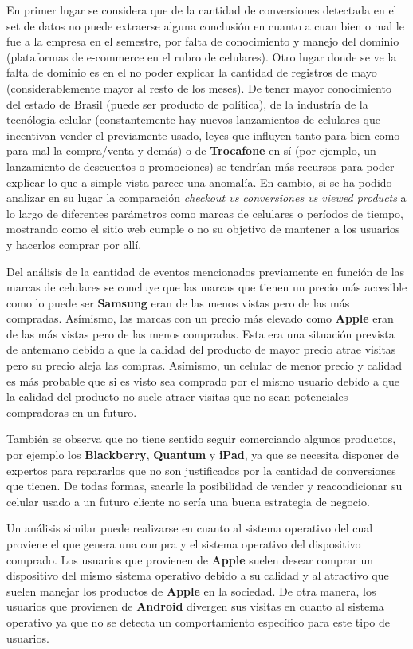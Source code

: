 \documentclass[a4paper]{article}
\begin{document}
En primer lugar se considera que de la cantidad de conversiones detectada en el set de datos no puede extraerse alguna conclusión en cuanto a cuan bien o mal le fue a la empresa en el semestre, por falta de conocimiento y manejo del dominio (plataformas de e-commerce en el rubro de celulares). Otro lugar donde se ve la falta de dominio es en el no poder explicar la cantidad de registros de mayo (considerablemente mayor al resto de los meses). De tener mayor conocimiento del estado de Brasil (puede ser producto de política), de la industría de la tecnólogia celular (constantemente hay nuevos lanzamientos de celulares que incentivan vender el previamente usado, leyes que influyen tanto para bien como para mal la compra/venta y demás) o de \textbf{Trocafone} en sí (por ejemplo, un lanzamiento de descuentos o promociones) se tendrían más recursos para poder explicar lo que a simple vista parece una anomalía. En cambio, si se ha podido analizar en su lugar la comparación \textit{checkout vs conversiones vs viewed products} a lo largo de diferentes parámetros como marcas de celulares o períodos de tiempo, mostrando como el sitio web cumple o no su objetivo de mantener a los usuarios y hacerlos comprar por allí.

Del análisis de la cantidad de eventos mencionados previamente en función de las marcas de celulares se concluye que las marcas que tienen un precio más accesible como lo puede ser \textbf{Samsung} eran de las menos vistas pero de las más compradas. Asímismo, las marcas con un precio más elevado como \textbf{Apple} eran de las más vistas pero de las menos compradas. Esta era una situación prevista de antemano debido a que la calidad del producto de mayor precio atrae visitas pero su precio aleja las compras. Asímismo, un celular de menor precio y calidad es más probable que si es visto sea comprado por el mismo usuario debido a que la calidad del producto no suele atraer visitas que no sean potenciales compradoras en un futuro. 

También se observa que no tiene sentido seguir comerciando algunos productos, por ejemplo los \textbf{Blackberry}, \textbf{Quantum} y  \textbf{iPad}, ya que se necesita disponer de expertos para repararlos que no son justificados por la cantidad de conversiones que tienen. De todas formas, sacarle la posibilidad de vender y reacondicionar su celular usado a un futuro cliente no sería una buena estrategia de negocio.

Un análisis similar puede realizarse en cuanto al sistema operativo del cual proviene el que genera una compra y el sistema operativo del dispositivo comprado. Los usuarios que provienen de \textbf{Apple} suelen desear comprar un dispositivo del mismo sistema operativo debido a su calidad y al atractivo que suelen manejar los productos de \textbf{Apple} en la sociedad. De otra manera, los usuarios que provienen de \textbf{Android} divergen sus visitas en cuanto al sistema operativo ya que no se detecta un comportamiento específico para este tipo de usuarios.
\end{document}
